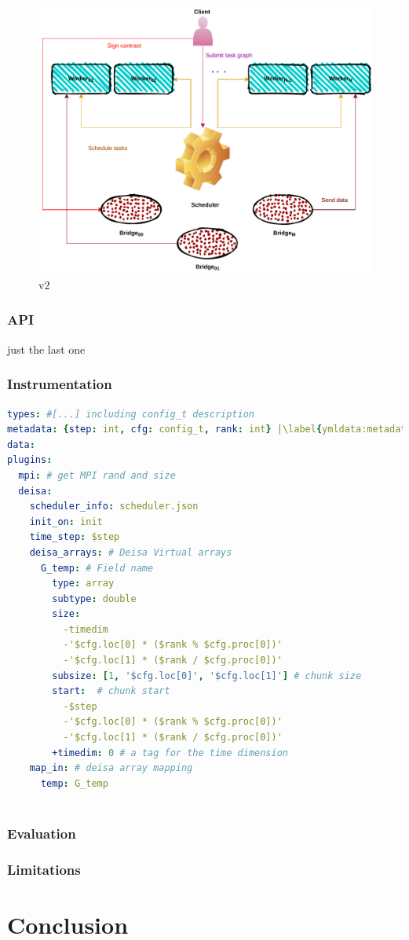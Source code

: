 \begin{figure}[tb]\centering
\includegraphics{figures/ArchiectureDeisaV2.pdf}
\caption{\deisa v2}
\label{figdeidav2}
\end{figure}
\subsubsection{API}
just the last one 
\subsubsection{Instrumentation}
\begin{lstlisting}[float, label=ymldata, language=yaml, caption=Data description in \pdi \deisa YAML file]
types: #[...] including config_t description
metadata: {step: int, cfg: config_t, rank: int} |\label{ymldata:metadata}|
data: 
plugins:
  mpi: # get MPI rand and size
  deisa:
    scheduler_info: scheduler.json
    init_on: init 
    time_step: $step 
    deisa_arrays: # Deisa Virtual arrays
      G_temp: # Field name
        type: array
        subtype: double
        size:
          -timedim 
          -'$cfg.loc[0] * ($rank % $cfg.proc[0])'
          -'$cfg.loc[1] * ($rank / $cfg.proc[0])'
        subsize: [1, '$cfg.loc[0]', '$cfg.loc[1]'] # chunk size
        start:  # chunk start
          -$step
          -'$cfg.loc[0] * ($rank % $cfg.proc[0])'
          -'$cfg.loc[1] * ($rank / $cfg.proc[0])'
        +timedim: 0 # a tag for the time dimension
    map_in: # deisa array mapping
      temp: G_temp
        
\end{lstlisting}
\subsubsection{Evaluation}
\subsubsection{Limitations}

\section{Conclusion}